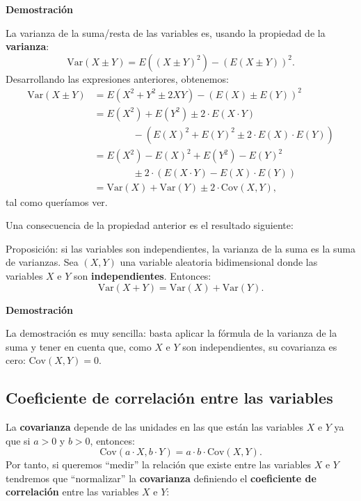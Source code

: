 \documentclass[
  letterpaper,
  DIV=11,
  numbers=noendperiod]{scrreprt}
\begin{document}
\textbf{Demostración}

La varianza de la suma/resta de las variables es, usando la propiedad de
la \textbf{varianza}: \[
\mathrm{Var}(X\pm Y)=E\left((X\pm Y)^2\right)-\left(E(X\pm Y)\right)^2.
\] Desarrollando las expresiones anteriores, obtenemos: \[
\begin{array}{rl}
\mathrm{Var}(X\pm Y) & =E\left(X^2+Y^2\pm 2XY\right)-\left(E(X)\pm E(Y)\right)^2 \\ & =
E(X^2)+E(Y^2)\pm 2\cdot E(X\cdot Y) \\ &\qquad\qquad - \left(E(X)^2+E(Y)^2\pm 2\cdot E(X)\cdot E(Y)\right)
\\ & = E(X^2)-E(X)^2+E(Y^2)-E(Y)^2\\ &\qquad\qquad \pm 2\cdot (E(X\cdot Y)-E(X)\cdot E(Y)) \\ & = \mathrm{Var}(X)+\mathrm{Var}(Y)\pm 2\cdot \mathrm{Cov}(X,Y),
\end{array}
\] tal como queríamos ver.

Una consecuencia de la propiedad anterior es el resultado siguiente:

Proposición: si las variables son independientes, la varianza de la suma
es la suma de varianzas. Sea \((X,Y)\) una variable aleatoria
bidimensional donde las variables \(X\) e \(Y\) son
\textbf{independientes}. Entonces: \[
\mathrm{Var}(X+Y)=\mathrm{Var}(X)+\mathrm{Var}(Y).
\]

\textbf{Demostración}

La demostración es muy sencilla: basta aplicar la fórmula de la varianza
de la suma y tener en cuenta que, como \(X\) e \(Y\) son independientes,
su covarianza es cero: \(\mathrm{Cov}(X,Y)=0\).

\hypertarget{coeficiente-de-correlaciuxf3n-entre-las-variables}{%
\subsection{Coeficiente de correlación entre las
variables}\label{coeficiente-de-correlaciuxf3n-entre-las-variables}}

La \textbf{covarianza} depende de las unidades en las que están las
variables \(X\) e \(Y\) ya que si \(a>0\) y \(b>0\), entonces: \[
\mathrm{Cov}(a\cdot X,b\cdot Y)=a\cdot b\cdot \mathrm{Cov}(X,Y).
\] Por tanto, si queremos ``medir'' la relación que existe entre las
variables \(X\) e \(Y\) tendremos que ``normalizar'' la
\textbf{covarianza} definiendo el \textbf{coeficiente de correlación}
entre las variables \(X\) e \(Y\):
\end{document}
